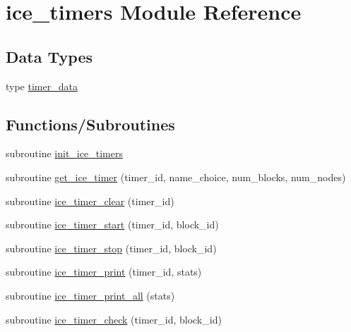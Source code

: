 \hypertarget{namespaceice__timers}{
\section{ice\_\-timers Module Reference}
\label{namespaceice__timers}
}
\subsection*{Data Types}
\begin{DoxyCompactItemize}
\item 
type \hyperlink{typeice__timers_1_1timer__data}{timer\_\-data}
\end{DoxyCompactItemize}
\subsection*{Functions/Subroutines}
\begin{DoxyCompactItemize}
\item 
subroutine \hyperlink{namespaceice__timers_aee6dba44293652055d7e94592a9496da}{init\_\-ice\_\-timers}
\item 
subroutine \hyperlink{namespaceice__timers_ae611f993fd7e53a0106a3ce5bf10c89f}{get\_\-ice\_\-timer} (timer\_\-id, name\_\-choice, num\_\-blocks, num\_\-nodes)
\item 
subroutine \hyperlink{namespaceice__timers_a888b240d9ec89cc7a91d2cb25b59f4e0}{ice\_\-timer\_\-clear} (timer\_\-id)
\item 
subroutine \hyperlink{namespaceice__timers_a308c3af934358cb1f050df7cce19ce79}{ice\_\-timer\_\-start} (timer\_\-id, block\_\-id)
\item 
subroutine \hyperlink{namespaceice__timers_ab483bb3b29e1839baf5a6bc2ad720ca8}{ice\_\-timer\_\-stop} (timer\_\-id, block\_\-id)
\item 
subroutine \hyperlink{namespaceice__timers_a8b8114bad0fd653247cdc104256c83ab}{ice\_\-timer\_\-print} (timer\_\-id, stats)
\item 
subroutine \hyperlink{namespaceice__timers_ace88d185debbc44901eff5a1d54d7fde}{ice\_\-timer\_\-print\_\-all} (stats)
\item 
subroutine \hyperlink{namespaceice__timers_a7e731661ee334413867a1c3c6356c129}{ice\_\-timer\_\-check} (timer\_\-id, block\_\-id)
\end{DoxyCompactItemize}
